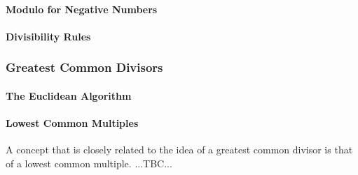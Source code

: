 



\paragraph{Modulo for Negative Numbers}



\paragraph{Divisibility Rules}
%


\subsubsection{Greatest Common Divisors}


\paragraph{The Euclidean Algorithm}



\paragraph{Lowest Common Multiples}
A concept that is closely related to the idea of a greatest common divisor is that of a lowest common multiple. ...TBC...

